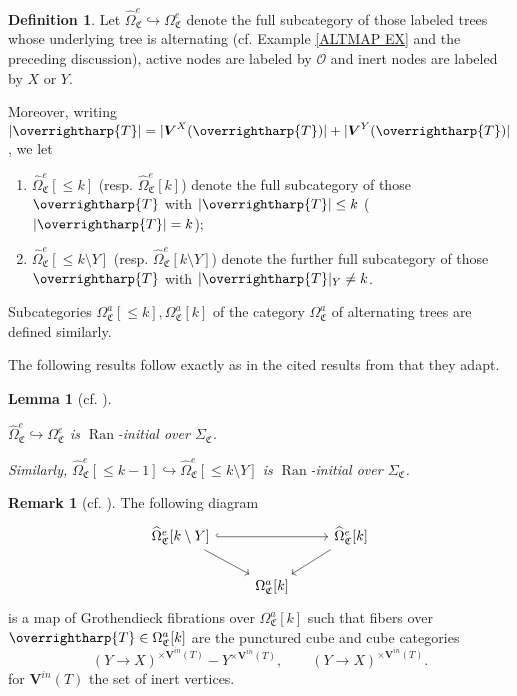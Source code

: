 \documentclass[a4paper,10pt
,draft
]{article}%
\numberwithin{equation}{section}
\numberwithin{figure}{section}
\newtheorem{lemma}[equation]{Lemma}%
\theoremstyle{definition} %
\newtheorem{definition}[equation]{Definition}%
\newtheorem{remark}[equation]{Remark}%
\newcommand{\into}{\hookrightarrow}%
\newcommand{\vect}[1]{\text{\overrightharp{\ensuremath{#1}}}}
\DeclareMathOperator{\Ran}{Ran}%
\renewcommand{\O}{\ensuremath{\mathcal O}}
\newcommand{\1}{\ensuremath{\mathbbm 1}}%
\newcommand{\SC}{\Sigma_{\mathfrak C}}
\newcommand{\OC}{\Omega_{\mathfrak C}}
\begin{document}
\begin{definition}
Let
$\widehat{\Omega}_{\mathfrak C}^{e} \hookrightarrow \Omega_{\mathfrak C}^{e}$
denote the full subcategory of those labeled trees whose underlying tree is alternating
(cf. Example \ref{ALTMAP EX} and the preceding discussion),
active nodes are labeled by $\O$ 
and inert nodes are labeled by $X$ or $Y$.

Moreover, writing 
$|\vect{T}| = |\boldsymbol{V}^X(\vect{T})|+ |\boldsymbol{V}^Y(\vect{T})|$, we let
\begin{enumerate}[label=(\roman*)]
\item $\widehat{\Omega}_{\mathfrak C}^{e}[\leq k]$ (resp. $\widehat{\Omega}_{\mathfrak C}^{e}[k]$)
denote the full subcategory of those $\vect{T}$ with $|\vect{T}| \leq k$ ($|\vect{T}|=k$);
\item $\widehat{\Omega}_{\mathfrak C}^{e}[\leq k \setminus Y]$ (resp. $\widehat{\Omega}_{\mathfrak C}^{e}[k \setminus Y]$)
denote the further full subcategory of those $\vect{T}$ with $|\vect{T}|_Y \neq k$.
\end{enumerate}
Subcategories $\OC^a[\leq k], \OC^a[k]$ of the category $\OC^a$
of alternating trees are defined similarly.
\end{definition}

The following results follow exactly as in the cited results from 
\cite{BP_geo} that they adapt.

\begin{lemma}[{cf. \cite[Cor. 5.53, Lemma 5.58]{BP_geo}}]
\label{LANINT LEM}

	$\widehat\Omega_{\mathfrak C}^e \into 
	\Omega_{\mathfrak C}^e$
	is $\Ran$-initial over $\SC$.
     
	Similarly, $\widehat\Omega_{\mathfrak C}^e[\leq k-1] \into 
\widehat\Omega_{\mathfrak C}^e[\leq k \setminus Y]$
	is $\Ran$-initial over $\SC$.
\end{lemma}

\begin{remark}[{cf. \cite[Remark 5.57]{BP_geo}}]
      \label{OEFIB REM}
      The following diagram
      \begin{equation}
            \begin{tikzcd}
                  \widehat\Omega_{\mathfrak C}^e[k \setminus Y] \arrow[rr, hookrightarrow] \arrow[dr]
                  &&
                  \widehat\Omega_{\mathfrak C}^e[k] \arrow[dl]
                  \\
                  &
                  \Omega_{\mathfrak C}^a[k]
            \end{tikzcd}
      \end{equation}
	is a map of Grothendieck fibrations over $\Omega_{\mathfrak C}^a[k]$
	such that fibers over $\vect{T} \in \Omega_{\mathfrak C}^a[k]$ are the punctured cube and cube categories
\begin{equation}
	(Y \to X)^{\times \boldsymbol{V}^{in}(T)} - Y^{\times \boldsymbol{V}^{in}(T)},
\qquad
	(Y \to X)^{\times \boldsymbol{V}^{in}(T)}.
\end{equation}
	for $\boldsymbol{V}^{in}(T)$ the set of inert vertices.
\end{remark}
\end{document}
